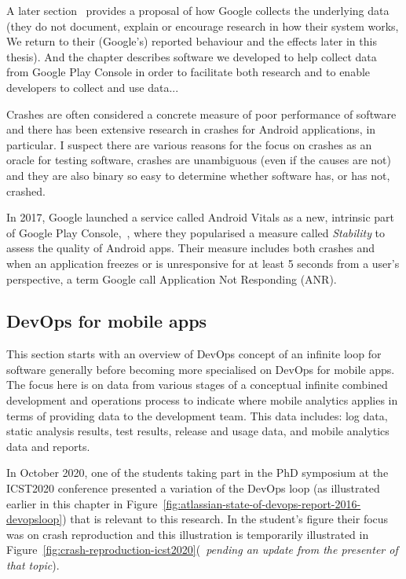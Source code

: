 A later section~\href{platform-level-analytics}{\emph{}} provides a proposal of how Google collects the underlying data (they do not document, explain or encourage research in how their system works, We return to their (Google's) reported behaviour and the effects later in this thesis). %
And the chapter \href{software-contributions-chapter}{\emph{}} describes software we developed to help collect data from Google Play Console in order to facilitate both research and to enable developers to collect and use data...

Crashes are often considered a concrete measure of poor performance of software and there has been extensive research in crashes for Android applications, in particular. I suspect there are various reasons for the focus on crashes as an oracle for testing software, crashes are unambiguous (even if the causes are not) and they are also binary so easy to determine whether software has, or has not, crashed. 

In 2017, Google launched a service called Android Vitals as a new, intrinsic part of Google Play Console,~\cite{googblogs_I_O_2017_everything_new_in_the_google_play_console}, where they popularised a measure called \emph{Stability} to assess the quality of Android apps. Their measure includes both crashes and when an application freezes or is unresponsive for at least 5 seconds from a user's perspective, a term Google call Application Not Responding (ANR).


\subsection{DevOps for mobile apps}
This section starts with an overview of DevOps concept of an infinite loop for software generally before becoming more specialised on DevOps for mobile apps. %
The focus here is on data from various stages of a conceptual infinite combined development and operations process to indicate where mobile analytics applies in terms of providing data to the development team. This data includes: log data, static analysis results, test results, release and usage data, and mobile analytics data and reports.

In October 2020, one of the students taking part in the PhD symposium at the ICST2020 conference presented a variation of the DevOps loop (as illustrated earlier in this chapter in Figure~\ref{fig:atlassian-state-of-devops-report-2016-devopsloop}) that is relevant to this research. In the student's figure their focus was on crash reproduction and this illustration is temporarily illustrated in Figure~\ref{fig:crash-reproduction-icst2020}(~\emph{pending an update from the presenter of that topic}).

